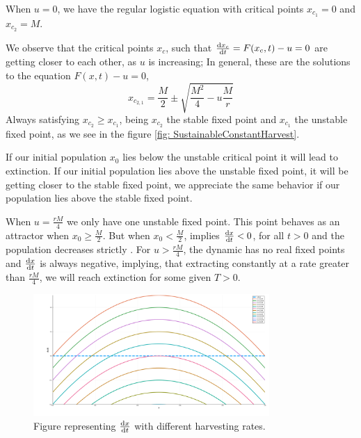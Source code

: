When $u=0$, we have the regular logistic equation with critical points $x_{c_1}=0$ and $x_{c_2}=M$.  

We observe that the critical points $x_c$, such that $\frac{\mathrm{d} x_c}{{\mathrm{d} t}}=F(x_c, t)-u=0$ are getting closer to each other, as $u$ is increasing; 
In general, these are the solutions to the equation $F(x,t)-u=0$,
\begin{equation}
x_{c_{2,1}}=\frac{M}{2}\pm \sqrt{\frac{M^2}{4}-u\frac{M}{r}}
\end{equation}
Always satisfying $x_{c_2}\geq x_{c_1}$, being $x_{c_2}$ the stable fixed point and $x_{c_1}$ the unstable fixed point, as we see in the figure \ref{fig: SustainableConstantHarvest}. 

If our initial population $x_0$ lies below the unstable critical point it will lead to extinction. If our initial population lies above the unstable fixed point, it will be getting closer to the stable fixed point, we appreciate the same behavior if our population lies above the stable fixed point.

When $u=\frac{rM}{4}$ we only have one unstable fixed point. This point behaves as an attractor when $x_0\geq\frac{M}{2}$. But when $x_0<\frac{M}{2}$, implies $\frac{\mathrm{d} x}{{\mathrm{d} t}}<0$, for all $t>0$ and the population decreases  strictly . For $u> \frac{rM}{4}$, the dynamic has no real fixed points and $\frac{\mathrm{d} x}{{\mathrm{d} t}}$ is always negative, implying, that extracting constantly at a rate greater than $\frac{rM}{4}$, we will reach extinction for some given $T>0$. 


\begin{figure}[H]
	\centering
	\includegraphics[width=0.8\textwidth]{CriticalPoints.png}
	\caption{Figure representing $\frac{\mathrm{d} x}{{\mathrm{d} t}}$ with different harvesting rates.}
	\label{fig: CriticalPoints}
\end{figure}



